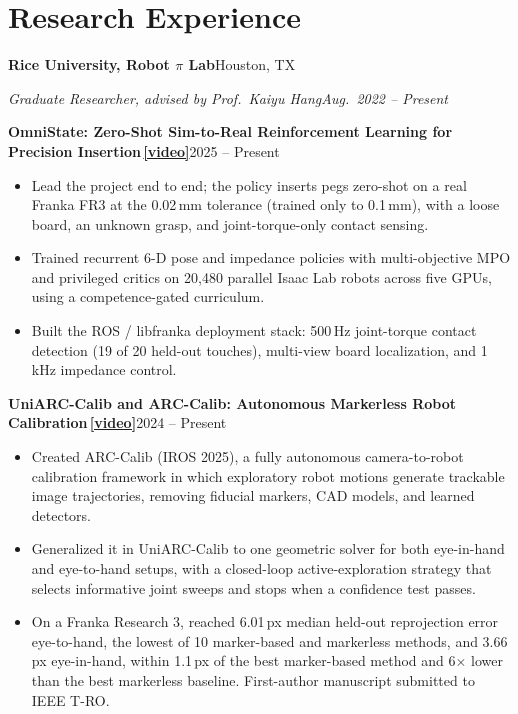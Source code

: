 \documentclass[10pt,letterpaper]{article}
\newcommand{\entry}[2]{\textbf{#1}\hfill #2\par}
\newcommand{\subentry}[2]{\textit{#1}\hfill\textit{#2}\par\vspace{1pt}}
\newcommand{\project}[2]{\vspace{3pt}\textbf{\color{accent!70!black}#1}\hfill{\small #2}\par}
\newcommand{\videolink}[1]{\,{\small\href{#1}{\color{accent}[video]}}}
\begin{document}
\section{Research Experience}
\entry{Rice University, Robot $\pi$ Lab}{Houston, TX}
\subentry{Graduate Researcher, advised by Prof.\ Kaiyu Hang}{Aug.\ 2022 -- Present}

\project{OmniState: Zero-Shot Sim-to-Real Reinforcement Learning for Precision Insertion\videolink{https://podshara.github.io/assets/videos/omnistate.mp4}}{2025 -- Present}
\begin{itemize}
  \item Lead the project end to end; the policy inserts pegs zero-shot on a real Franka FR3 at the 0.02\,mm tolerance
    (trained only to 0.1\,mm), with a loose board, an unknown grasp, and joint-torque-only contact sensing.
  \item Trained recurrent 6-D pose and impedance policies with multi-objective MPO and privileged critics on 20,480
    parallel Isaac Lab robots across five GPUs, using a competence-gated curriculum.
  \item Built the ROS / libfranka deployment stack: 500\,Hz joint-torque contact detection (19 of 20 held-out touches),
    multi-view board localization, and 1\,kHz impedance control.
\end{itemize}

\project{UniARC-Calib and ARC-Calib: Autonomous Markerless Robot Calibration\videolink{https://www.youtube.com/watch?v=MfGvsxcbBNw}}{2024 -- Present}
\begin{itemize}
  \item Created ARC-Calib (IROS 2025), a fully autonomous camera-to-robot calibration framework in which exploratory
    robot motions generate trackable image trajectories, removing fiducial markers, CAD models, and learned detectors.
  \item Generalized it in UniARC-Calib to one geometric solver for both eye-in-hand and eye-to-hand setups, with a
    closed-loop active-exploration strategy that selects informative joint sweeps and stops when a confidence test passes.
  \item On a Franka Research 3, reached 6.01\,px median held-out reprojection error eye-to-hand, the lowest of 10
    marker-based and markerless methods, and 3.66\,px eye-in-hand, within 1.1\,px of the best marker-based method and
    6$\times$ lower than the best markerless baseline. First-author manuscript submitted to IEEE T-RO.
\end{itemize}
\end{document}
